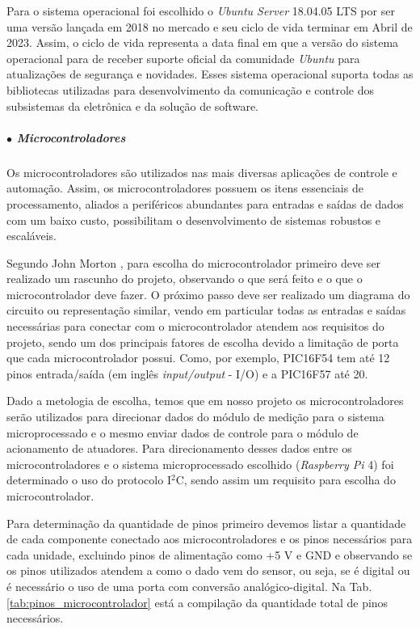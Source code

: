    Para o sistema operacional foi escolhido o \textit{Ubuntu Server} 18.04.05 LTS por ser uma versão lançada em 2018 no mercado e seu ciclo de vida terminar em Abril de 2023. Assim, o ciclo de vida representa a data final em que a versão do sistema operacional para de receber suporte oficial da comunidade \textit{Ubuntu} para atualizações de segurança e novidades. Esses sistema operacional suporta todas as bibliotecas utilizadas para desenvolvimento da comunicação e controle dos subsistemas da eletrônica e da solução de software.
    
    \subparagraph*{$\bullet$ Microcontroladores} \hfill
    
    Os microcontroladores são utilizados nas mais diversas aplicações de controle e automação. Assim, os microcontroladores possuem os itens essenciais de processamento, aliados a periféricos abundantes para entradas e saídas de dados com um  baixo custo, possibilitam o desenvolvimento de sistemas robustos e escaláveis.
    
    Segundo John Morton \cite{morton2005pic}, para escolha do microcontrolador primeiro deve ser realizado um rascunho do projeto, observando o que será feito e o que o microcontrolador deve fazer. O próximo passo deve ser realizado um diagrama do circuito ou representação similar, vendo em particular todas as entradas e saídas necessárias para conectar com o microcontrolador atendem aos requisitos do projeto, sendo um dos principais fatores de escolha devido a limitação de porta que cada microcontrolador possui. Como, por exemplo, PIC16F54 tem até 12 pinos entrada/saída (em inglês \textit{input/output} - I/O) e a PIC16F57 até 20.
    
    Dado a metologia de escolha, temos que em nosso projeto os microcontroladores serão utilizados para direcionar dados do módulo de medição para o sistema microprocessado e o mesmo enviar dados de controle para o módulo de acionamento de atuadores. Para direcionamento desses dados entre os microcontroladores e o sistema microprocessado escolhido (\textit{Raspberry Pi} 4) foi determinado o uso do protocolo I$^2$C, sendo assim um requisito para escolha do microcontrolador.
    
    Para determinação da quantidade de pinos primeiro devemos listar a quantidade de cada componente conectado aos microcontroladores e os pinos necessários para cada unidade, excluindo pinos de alimentação como +5 V e GND e observando se os pinos utilizados atendem a como o dado vem do sensor, ou seja, se é digital ou é necessário o uso de uma porta com conversão analógico-digital. Na Tab. \ref{tab:pinos_microcontrolador} está a compilação da quantidade total de pinos necessários.
    
